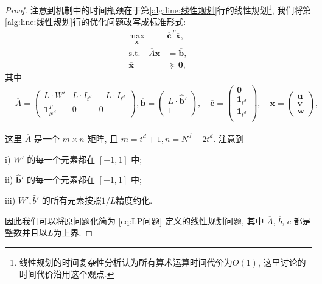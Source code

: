 \begin{proof}
注意到机制中的时间瓶颈在于第\ref{alg:line:线性规划}行的线性规划\footnote{线性规划的时间复杂性分析认为所有算术运算时间代价为$O(1)$, 这里讨论的时间代价沿用这个观点.}, 我们将第\ref{alg:line:线性规划}行的优化问题改写成标准形式:
\begin{align} \label{eq:LP问题}
  \max_{\overline{\mathbf{x}}} \quad&\overline{\mathbf{c}}^T \overline{\mathbf{x}},\\
  \text{s.t.} \quad  \overline{A} \overline{\mathbf{x}} &= \overline{\mathbf{b}}, \nonumber\\
                     \overline{\mathbf{x}} &\succeq \mathbf{0},\nonumber
\end{align}
其中
\begin{align*}
  &\overline{A} =
  \begin{pmatrix}
    L\cdot W' & L\cdot I_{t^d} & -L\cdot I_{t^d} \\
    \mathbf{1}_{N^d}^T & 0 & 0
  \end{pmatrix}, 
  \overline{\mathbf{b}} = 
  \begin{pmatrix}
    L \cdot\hat{\mathbf{b}}' \\ 1
  \end{pmatrix}, \quad
  \overline{\mathbf{c}} =
  \begin{pmatrix}
    \mathbf{0} \\ \mathbf{1}_{t^d} \\ \mathbf{1}_{t^d}\\
  \end{pmatrix}, \quad
  \overline{\mathbf{x}} =
  \begin{pmatrix}
    \mathbf{u} \\ \mathbf{v} \\ \mathbf{w}
  \end{pmatrix},
\end{align*}

这里 $\overline{A}$ 是一个 $\overline{m}\times\overline{n}$ 矩阵, 且 $\overline{m}=t^d+1, \overline{n}=N^d+2t^d$. 
注意到

i)  $W'$ 的每一个元素都在 $[-1,1]$ 中;

ii) $\hat{\mathbf{b}}'$ 的每一个元素都在 $[-1,1]$ 中;

iii) $W', \hat{b}'$ 的所有元素按照$1/L$精度约化.

因此我们可以将原问题化简为 \eqref{eq:LP问题} 定义的线性规划问题, 其中 $\overline{A}$, $\overline{b}$, $\overline{c}$ 都是整数并且以$L$为上界.


\end{proof}
